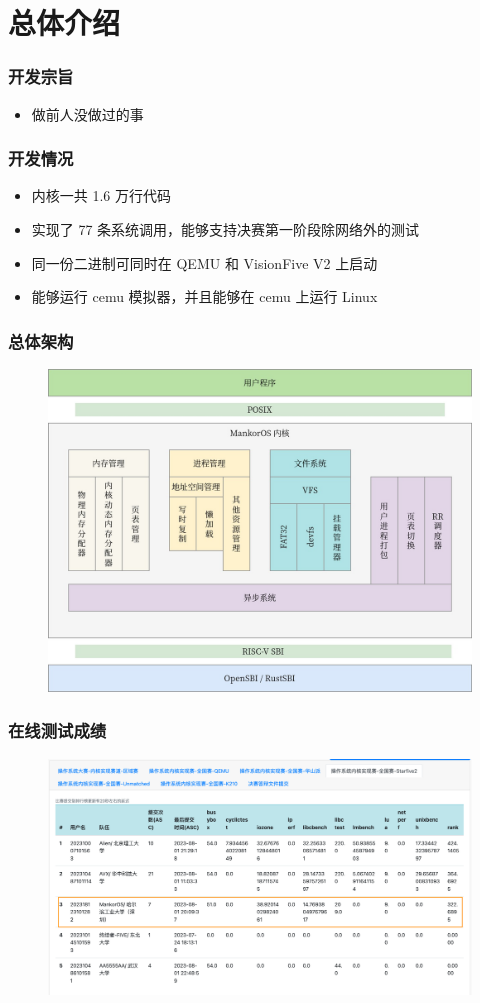 \section{总体介绍}

\begin{frame}
    \frametitle{开发宗旨}

    \begin{itemize}
        \item 做前人没做过的事
    \end{itemize}

\end{frame}

\begin{frame}
    \frametitle{开发情况}

    \begin{itemize}
        \item 内核一共 1.6 万行代码
        \item 实现了 77 条系统调用，能够支持决赛第一阶段除网络外的测试
        \item 同一份二进制可同时在 QEMU 和 VisionFive V2 上启动
        \item 能够运行 cemu 模拟器，并且能够在 cemu 上运行 Linux
    \end{itemize}

\end{frame}

\begin{frame}
    \frametitle{总体架构}
    \begin{figure}
        \includegraphics[width=.6\textwidth]{assets/Arch.jpg}
    \end{figure}

\end{frame}

\begin{frame}
    \frametitle{在线测试成绩}
    \begin{figure}
        \centering
        \includegraphics[width=.7\textwidth]{assets/rank.png}
    \end{figure}

\end{frame}
